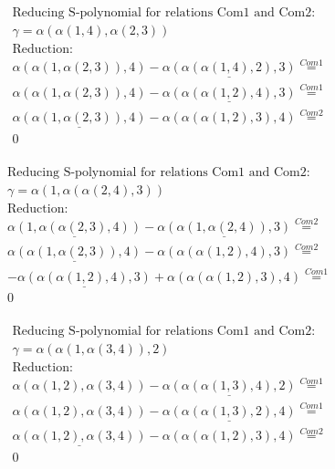 \documentclass[11pt]{amsart}
\begin{document}
\begin{align*} 
& \text{Reducing S-polynomial for relations Com1 and Com2:} \\ 
& \gamma = \alpha(\alpha(1,4),\alpha(2,3)) \\ 
& \text{Reduction}: \\&\alpha(\alpha(1,\alpha(2,3)),4) - \underline{\alpha(\alpha(\alpha(1,4),2),3)} \stackrel{ Com1 }{=}  \\ 
&\alpha(\alpha(1,\alpha(2,3)),4) - \underline{\alpha(\alpha(\alpha(1,2),4),3)} \stackrel{ Com1 }{=}  \\ 
&\underline{\alpha(\alpha(1,\alpha(2,3)),4)} - \alpha(\alpha(\alpha(1,2),3),4) \stackrel{ Com2 }{=}  \\ 
&0\\ 
\end{align*} 
 
\begin{align*} 
& \text{Reducing S-polynomial for relations Com1 and Com2:} \\ 
& \gamma = \alpha(1,\alpha(\alpha(2,4),3)) \\ 
& \text{Reduction}: \\&\underline{\alpha(1,\alpha(\alpha(2,3),4))} - \underline{\alpha(\alpha(1,\alpha(2,4)),3)} \stackrel{ Com2 }{=}  \\ 
&\underline{\alpha(\alpha(1,\alpha(2,3)),4)} - \alpha(\alpha(\alpha(1,2),4),3) \stackrel{ Com2 }{=}  \\ 
& - \underline{\alpha(\alpha(\alpha(1,2),4),3)} + \alpha(\alpha(\alpha(1,2),3),4) \stackrel{ Com1 }{=}  \\ 
&0\\ 
\end{align*} 
 
\begin{align*} 
& \text{Reducing S-polynomial for relations Com1 and Com2:} \\ 
& \gamma = \alpha(\alpha(1,\alpha(3,4)),2) \\ 
& \text{Reduction}: \\&\alpha(\alpha(1,2),\alpha(3,4)) - \underline{\alpha(\alpha(\alpha(1,3),4),2)} \stackrel{ Com1 }{=}  \\ 
&\alpha(\alpha(1,2),\alpha(3,4)) - \underline{\alpha(\alpha(\alpha(1,3),2),4)} \stackrel{ Com1 }{=}  \\ 
&\underline{\alpha(\alpha(1,2),\alpha(3,4))} - \alpha(\alpha(\alpha(1,2),3),4) \stackrel{ Com2 }{=}  \\ 
&0\\ 
\end{align*} 
 
\end{document}
